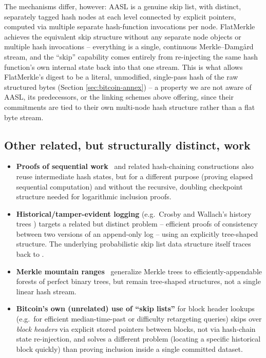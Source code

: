 The mechanisms differ, however: AASL is a genuine skip list, with distinct,
separately tagged hash nodes at each level connected by explicit pointers,
computed via multiple separate hash-function invocations per node.
FlatMerkle achieves the equivalent skip structure without any separate
node objects or multiple hash invocations -- everything is a single,
continuous Merkle--Damg\aa rd stream, and the ``skip'' capability comes
entirely from re-injecting the same hash function's own internal state
back into that one stream. This is what allows FlatMerkle's digest to be a
literal, unmodified, single-pass hash of the raw structured bytes (Section
\ref{sec:bitcoin-annex}) -- a property we are not aware of AASL, its
predecessors, or the linking schemes above offering, since their
commitments are tied to their own multi-node hash structure rather than a
flat byte stream.

\subsection{Other related, but structurally distinct, work}

\begin{itemize}
\item \textbf{Proofs of sequential work}~\citep{mahmoody2013sequential} and
  related hash-chaining constructions also reuse intermediate hash states,
  but for a different purpose (proving elapsed sequential computation) and
  without the recursive, doubling checkpoint structure needed for
  logarithmic inclusion proofs.
\item \textbf{Historical/tamper-evident logging} (e.g.\ Crosby and Wallach's
  history trees \citep{crosby2009}) targets a related but distinct problem
  -- efficient proofs of consistency between two versions of an append-only
  log -- using an explicitly tree-shaped structure. The underlying
  probabilistic skip list data structure itself traces back to
  \citet{pugh1990}.
\item \textbf{Merkle mountain ranges}~\citep{todd2016mmr} generalize Merkle
  trees to efficiently-appendable forests of perfect binary trees, but
  remain tree-shaped structures, not a single linear hash stream.
\item \textbf{Bitcoin's own (unrelated) use of ``skip lists''} for block
  header lookups (e.g.\ for efficient median-time-past or difficulty
  retargeting queries) skips over \emph{block headers} via explicit stored
  pointers between blocks, not via hash-chain state re-injection, and
  solves a different problem (locating a specific historical block quickly)
  than proving inclusion inside a single committed dataset.
\end{itemize}

